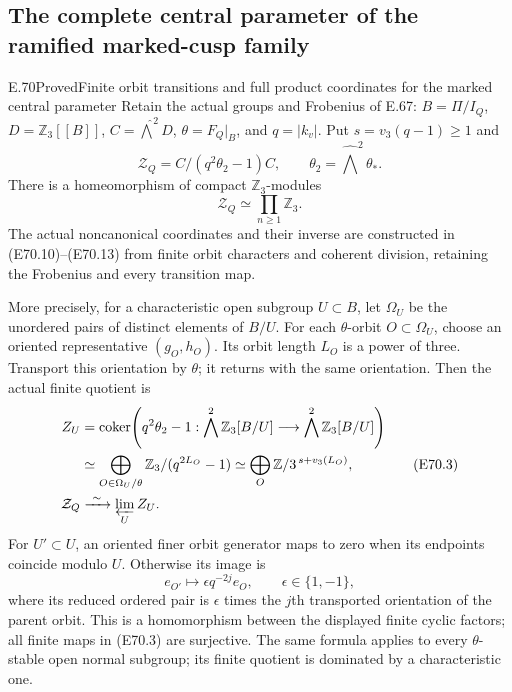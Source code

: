 \subsection{The complete central parameter of the ramified marked-cusp family}

\begin{statement}{E.70}{Proved}{Finite orbit transitions and full product coordinates for the marked central parameter}
Retain the actual groups and Frobenius of E.67:
$B=\Pi/I_Q$, $D=\mathbb Z_3[[B]]$,
$C=\widehat{\bigwedge}^2D$,
$\theta=F_Q|_B$, and $q=|k_v|$.
Put $s=v_3(q-1)\ge1$ and
\[
          \mathcal Z_Q=C/(q^2\theta_2-1)C,\qquad
          \theta_2=\widehat{\bigwedge}^2\theta_* .
 \tag{E70.1}
\]
There is a homeomorphism of compact $\mathbb Z_3$-modules
\[
                    \mathcal Z_Q
                         \simeq\prod_{n\ge1}\mathbb Z_3 .
 \tag{E70.2}
\]
The actual noncanonical coordinates and their inverse
are constructed in (E70.10)--(E70.13) from finite orbit
characters and coherent division, retaining the
Frobenius and every transition map.

More precisely, for a characteristic open subgroup
$U\subset B$, let $\Omega_U$ be the unordered pairs
of distinct elements of $B/U$. For each $\theta$-orbit
$O\subset\Omega_U$, choose an oriented representative
$(g_O,h_O)$. Its orbit length $L_O$ is a power of three.
Transport this orientation by $\theta$; it returns
with the same orientation. Then the actual finite
quotient is
\[
 \begin{split}
 Z_U&=\operatorname{coker}\!
   \left(q^2\theta_2-1:
       \bigwedge^2\mathbb Z_3[B/U]
          \longrightarrow\bigwedge^2\mathbb Z_3[B/U]\right)\\
    &\simeq\bigoplus_{O\in\Omega_U/\theta}
           \mathbb Z_3/(q^{2L_O}-1)
     \simeq\bigoplus_O\mathbb Z/3^{\,s+v_3(L_O)},\\
 \mathcal Z_Q&\xrightarrow{\ \sim\ }\varprojlim_U Z_U .
 \end{split}
 \tag{E70.3}
\]
For $U'\subset U$, an oriented finer orbit generator
maps to zero when its endpoints coincide modulo $U$.
Otherwise its image is
\[
             e_{O'}\longmapsto
                    \epsilon q^{-2j}e_O ,
 \qquad \epsilon\in\{1,-1\},
 \tag{E70.4}
\]
where its reduced ordered pair is $\epsilon$ times
the $j$th transported orientation of the parent orbit.
This is a homomorphism between the displayed finite
cyclic factors; all finite maps in (E70.3) are
surjective. The same formula applies to every
$\theta$-stable open normal subgroup; its finite
quotient is dominated by a characteristic one.


\end{statement}
